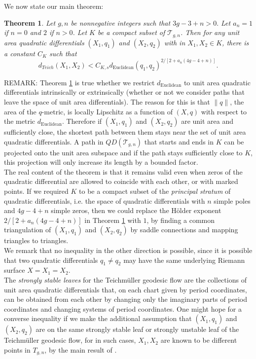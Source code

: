 \documentclass[12pt]{article}
\newtheorem{theorem}{Theorem}[section]
\begin{document}
\noindent We now state our main theorem:\\

\begin{theorem}\label{TheoremMain}
Let $g,n$ be nonnegative integers such that $3g - 3 + n > 0.$ Let $a_n = 1$ if $n = 0$ and $2$ if $n > 0$. Let $K$ be a compact subset of $\mathcal{T}_{g,n}$. Then for any unit area quadratic differentials $(X_1,q_1)$ and $(X_2,q_2)$ with in $X_1,X_2 \in K$, there is a constant $C_{K}$ such that $$d_{Teich}(X_1,X_2) < C_{K,s} d_{\mathrm{Euclidean}}(q_1,q_2)^{2/[2 + a_n(4g-4 + n)]}.$$
\end{theorem}

\noindent REMARK: Theorem \ref{TheoremMain} is true whether we restrict $d_\mathrm{Euclidean}$ to unit area quadratic differentials intrinsically or extrinsically (whether or not we consider paths that leave the space of unit area differentials). The reason for this is that $\|q\|$, the area of the $q$-metric, is locally Lipschitz as a function of $(X,q)$ with respect to the metric $d_\mathrm{Euclidean}$. Therefore if $(X_1,q_1)$ and $(X_2,q_2)$ are unit area and sufficiently close, the shortest path between them stays near the set of unit area quadratic differentials. A path in $QD(\mathcal{T}_{g,n})$ that starts and ends in $K$ can be projected onto the unit area subspace and if the path stays sufficiently close to $K$, this projection will only increase its length by a bounded factor.\\

\noindent The real content of the theorem is that it remains valid even when zeros of the quadratic differential are allowed to coincide with each other, or with marked points. If we required $K$ to be a compact subset of the \emph{principal stratum} of quadratic differentials, i.e. the space of quadratic differentials with $n$ simple poles and $4g-4+n$ simple zeros, then we could replace the H\"older exponent $2/[2 + a_n(4g-4 + n)]$ in Theorem \ref{TheoremMain} with $1$, by finding a common triangulation of $(X_1,q_1)$ and $(X_2,q_2)$ by saddle connections and mapping triangles to triangles.\\

\noindent We remark that no inequality in the other direction is possible, since it is possible that two quadratic differentials $q_1 \neq q_2$ may have the same underlying Riemann surface $X = X_1 = X_2$.\\

\noindent The \emph{strongly stable leaves} for the Teichm\"uller geodesic flow are the collections of unit area quadratic differentials that, on each chart given by period coordinates, can be obtained from each other by changing only the imaginary parts of period coordinates and changing systems of period coordinates. One might hope for a converse inequality if we make the additional assumption that $(X_1,q_1)$ and $(X_2,q_2)$ are on the same strongly stable leaf or strongly unstable leaf of the Teichm\"uller geodesic flow, for in such cases, $X_1,X_2$ are known to be different points in $T_{g,n}$, by the main result of \cite{HM}.\\
\end{document}
